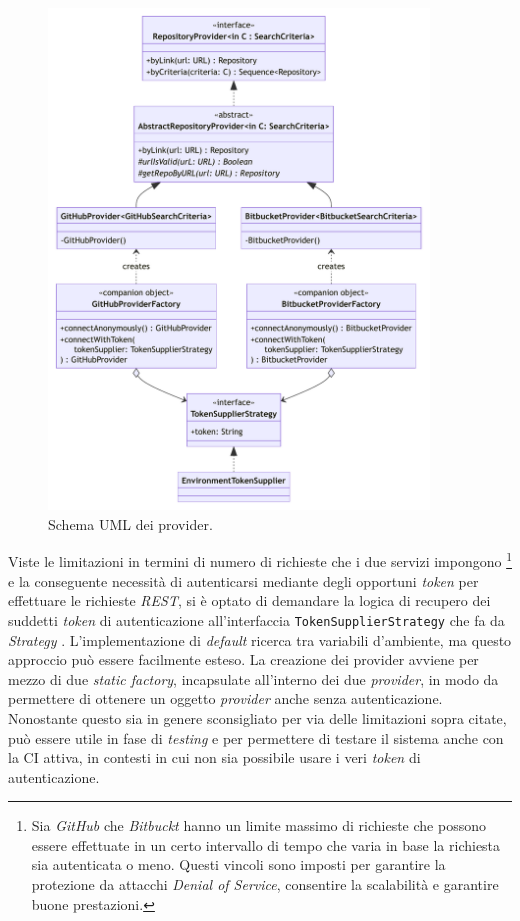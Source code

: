 \begin{figure}[h!]
    \centering
    \includegraphics[width=0.9\textwidth]{resources/img/02-provider.pdf}
    \caption{Schema UML dei provider.}
    \label{img:02-provider}
\end{figure}

Viste le limitazioni in termini di numero di richieste che i due servizi impongono \footnote{Sia \textit{GitHub} che \textit{Bitbuckt} hanno un limite massimo di richieste che possono essere effettuate in un certo intervallo di tempo che varia in base la richiesta sia autenticata o meno. Questi vincoli sono imposti per garantire la protezione da attacchi \textit{Denial of Service}, consentire la scalabilità e garantire buone prestazioni.} e la conseguente necessità di autenticarsi mediante degli opportuni \textit{token} per effettuare le richieste \textit{REST}, si è optato di demandare la logica di recupero dei suddetti \textit{token} di autenticazione all'interfaccia \texttt{TokenSupplierStrategy} che fa da \textit{Strategy} \cite{gof}.
%
L'implementazione di \textit{default} ricerca tra variabili d'ambiente, ma questo approccio può essere facilmente esteso.
%
%
La creazione dei provider avviene per mezzo di due \textit{static factory}, incapsulate all'interno dei due \textit{provider}, in modo da permettere di ottenere un oggetto \textit{provider} anche senza autenticazione.
%
Nonostante questo sia in genere sconsigliato per via delle limitazioni sopra citate, può essere utile in fase di \textit{testing} e per permettere di testare il sistema anche con la CI attiva, in contesti in cui non sia possibile usare i veri \textit{token} di autenticazione.

